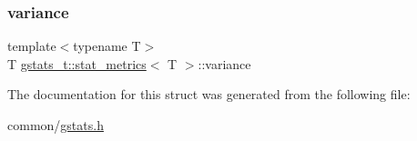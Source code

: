 \subsubsection{\texorpdfstring{variance}{variance}}
{\footnotesize\ttfamily template$<$typename T$>$ \\
T \hyperlink{structgstats__t_1_1stat__metrics}{gstats\+\_\+t\+::stat\+\_\+metrics}$<$ T $>$\+::variance}



The documentation for this struct was generated from the following file\+:\begin{DoxyCompactItemize}
\item 
common/\hyperlink{gstats_8h}{gstats.\+h}\end{DoxyCompactItemize}

